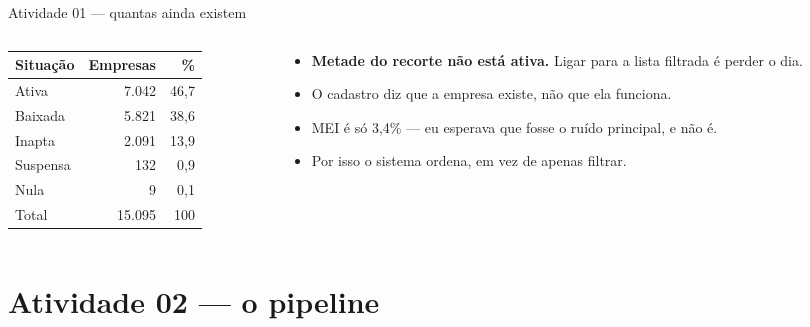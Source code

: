 \documentclass[aspectratio=169]{beamer}
\newcommand{\recorte}{15.095}
\begin{document}
\begin{frame}{Atividade 01 --- quantas ainda existem}
    \begin{columns}[T]
        \begin{column}{0.44\textwidth}
            \begin{table}
                \footnotesize
                \begin{tabular}{lrr}
                    \toprule
                    Situação & Empresas & \% \\
                    \midrule
                    Ativa    & 7.042 & 46,7 \\
                    Baixada  & 5.821 & 38,6 \\
                    Inapta   & 2.091 & 13,9 \\
                    Suspensa &   132 &  0,9 \\
                    Nula     &     9 &  0,1 \\
                    \midrule
                    Total    & \recorte & 100 \\
                    \bottomrule
                \end{tabular}
            \end{table}
        \end{column}
        \begin{column}{0.52\textwidth}
            \begin{itemize}
                \item \textbf{Metade do recorte não está ativa.} Ligar para a
                      lista filtrada é perder o dia.
                \item O cadastro diz que a empresa existe, não que ela
                      funciona.
                \item MEI é só 3,4\% --- eu esperava que fosse o ruído
                      principal, e não é.
                \item Por isso o sistema ordena, em vez de apenas filtrar.
            \end{itemize}
        \end{column}
    \end{columns}
\end{frame}

\section{Atividade 02 --- o pipeline}
\end{document}
